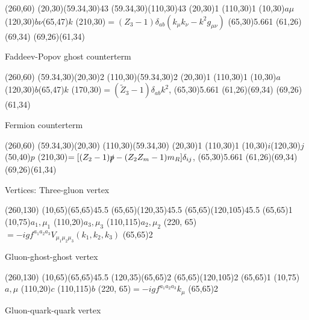 \begin{axopicture}(260,60) %
	\Gluon(20,30)(59.34,30){4}{3}
	\Gluon(59.34,30)(110,30){4}{3}
	\Vertex(20,30){1}
	\Vertex(110,30){1}
	\Text(10,30){$a\mu$}\Text(120,30){$b\nu$}\Text(65,47){$k$}
	\Text(210,30){$=(Z_3-1)\delta_{ab}(k_\mu k_\nu-k^2g_{\mu\nu})$}
	\GCirc(65,30){5.66}{1}	
	\Line(61,26)(69,34)
	\Line(69,26)(61,34)	 %
\end{axopicture}
\newline
Faddeev-Popov ghost counterterm

\begin{axopicture}(260,60) %
	\DashLine[arrow](59.34,30)(20,30){2}
	\DashLine[arrow](110,30)(59.34,30){2}
	\Vertex(20,30){1}
	\Vertex(110,30){1}
	\Text(10,30){$a$}\Text(120,30){$b$}\Text(65,47){$k$}
	\Text(170,30){$=(\widetilde{Z}_3-1)\delta_{ab}k^2$,}
	\GCirc(65,30){5.66}{1}		
	\Line(61,26)(69,34)
	\Line(69,26)(61,34)	 %
	
\end{axopicture}
\newline
Fermion counterterm

\begin{axopicture}(260,60) %
	\Line[arrow](59.34,30)(20,30)
	\Line[arrow](110,30)(59.34,30)
	\Vertex(20,30){1}
	\Vertex(110,30){1}
	\Text(10,30){$i$}\Text(120,30){$j$}\Text(50,40){$p$}
	\Text(210,30){$=[(Z_2-1)\slashed p-(Z_2Z_m-1)m_R]\delta_{ij}$,}
	\GCirc(65,30){5.66}{1}	
	\Line(61,26)(69,34)
	\Line(69,26)(61,34)	 %
\end{axopicture}	


Vertices:	
\newline
Three-gluon vertex

\begin{axopicture}(260,130) %
	\Gluon(10,65)(65,65){4}{5.5} 
	\Gluon(65,65)(120,35){4}{5.5}
	\Gluon(65,65)(120,105){4}{5.5}
	\Vertex(65,65){1}		
	\Text(10,75){$a_1, \mu_1$}
	\Text(110,20){$a_3, \mu_3$}
	\Text(110,115){$a_2, \mu_2$}
	\Text(220, 65){$=-igf^{a_1a_2a_3}V_{\mu_1\mu_2\mu_3}(k_1,k_2,k_3)$}
	\Vertex(65,65){2}
\end{axopicture}
\newline
Gluon-ghost-ghost vertex

\begin{axopicture}(260,130) %
	\Gluon(10,65)(65,65){4}{5.5} 
	\DashLine[arrow](120,35)(65,65){2}
	\DashLine[arrow](65,65)(120,105){2}
	\Vertex(65,65){1}		
	\Text(10,75){$a, \mu$}
	\Text(110,20){$c$}
	\Text(110,115){$b$}
	\Text(220, 65){$=-igf^{a_1a_2a_3}k_\mu$}
	\Vertex(65,65){2}
\end{axopicture}
\newline
Gluon-quark-quark vertex

